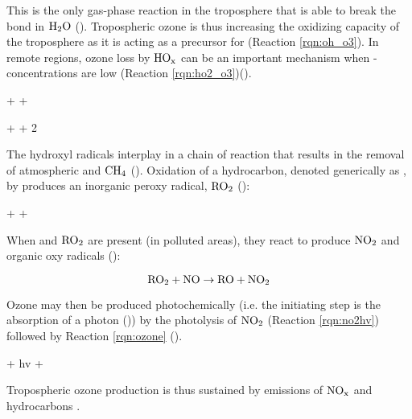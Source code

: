 This is the only gas-phase reaction in the troposphere that is able to break the  bond in $\mathrm{H_2O}$ (\cite{SeinfeldSpyros}). Tropospheric ozone is thus increasing the oxidizing capacity of the troposphere as it is acting as a precursor for  (Reaction \ref{rqn:oh_o3}). In remote regions, ozone loss by $\mathrm{HO_x}$ can be an important mechanism when -concentrations are low (Reaction \ref{rqn:ho2_o3})(\cite{Jacob1999}). 


\begin{reaction}
     +  \rightarrow {} + 
    \label{rqn:oh_o3}
\end{reaction}
\begin{reaction}
     +  \rightarrow {} + 2
    \label{rqn:ho2_o3}
\end{reaction}

The hydroxyl radicals interplay in a chain of reaction that results in the removal of atmospheric  and $\mathrm{CH_4}$ (\cite{Levy1971}). Oxidation of a hydrocarbon, denoted generically as , by  produces an inorganic peroxy radical, $\mathrm{RO_2}$ (\cite{Jacob1999}):

\begin{reaction}
     +    + 
\end{reaction}

When  and $\mathrm{RO_2}$ are present (in polluted areas), they react to produce $\mathrm{NO_2}$ and organic oxy radicals  (\cite{Jacob1999}): 

\begin{equation}
    \mathrm{RO_2} + \mathrm{NO} \rightarrow \mathrm{RO} + \mathrm{NO_2}
\end{equation}

Ozone may then be produced photochemically (i.e. the initiating step is the absorption of a photon (\cite{Cadle1970})) by the photolysis of $\mathrm{NO_2}$ (Reaction \ref{rqn:no2hv}) followed by Reaction \ref{rqn:ozone} (\cite{Hesstvedt1978}).


\begin{reaction}
     + hv \rightarrow {} + 
    \label{rqn:no2hv}
\end{reaction}

Tropospheric ozone production is thus sustained by emissions of $\mathrm{NO_x}$ and hydrocarbons \cite{Jacob1999}. 






